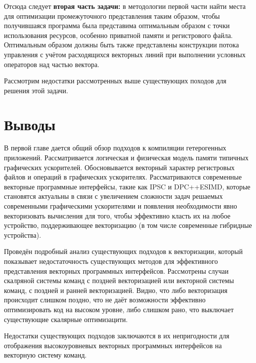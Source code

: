 Отсюда следует \textbf{вторая часть задачи:} в методологии первой части найти места для оптимизации промежуточного представления таким образом, чтобы получившаяся программа была представима оптимальным образом с точки использования ресурсов, особенно приватной памяти и регистрового файла. Оптимальным образом должны быть также представлены конструкции потока управления с учётом расходящихся векторных линий при выполнении условных операторов над частью вектора.

Рассмотрим недостатки рассмотренных выше существующих походов для решения этой задачи.

\section{Выводы}\label{sec:overview/outcome}

В первой главе дается общий обзор подходов к компиляции гетерогенных приложений. Рассматривается логическая и физическая модель памяти типичных графических ускорителей. Обосновывается векторный характер регистровых файлов и операций в графических ускорителях. Рассматриваются современные векторные программные интерфейсы, такие как IPSC и DPC++ESIMD, которые становятся актуальны в связи с увеличением сложности задач решаемых современными графическими ускорителями и появления необходимости явно векторизовать вычисления для того, чтобы эффективно класть их на любое устройство, поддерживающее векторизацию (в том числе современные гибридные устройства). 

Проведён подробный анализ существующих подходов к векторизации, который показывает недостаточность существующих методов для эффективного представления векторных программных интерфейсов. Рассмотрены случаи скалряной системы команд с поздней векторизацией или векторной системы команд, с поздней и ранней векторизацией. Видно, что либо векторизация происходит слишком поздно, что не даёт возможности эффективно оптимизировать код на высоком уровне, либо слишком рано, что выключает существующие скалярные оптимизацити.

Недостатки существующих подходов заключаются в их непригодности для отображения высокоуровневых векторных программных интерфейсов на векторную систему команд.

\FloatBarrier
